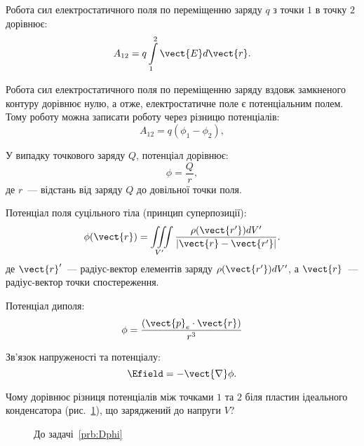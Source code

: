  \begin{Theory}\small
	Робота сил електростатичного поля по переміщенню заряду $q$ з точки $1$ в точку $2$ дорівнює:
	\begin{equation}\label{work}
		A_{12} = q\int\limits_1^2 \vect{E}d\vect{r}.
	\end{equation}

	Робота сил електростатичного поля по переміщенню заряду вздовж замкненого контуру дорівнює нулю, а отже, електростатичне поле є потенціальним полем. Тому роботу можна записати роботу через різницю потенціалів:
	\begin{equation}\label{work_potential}
		A_{12} = q(\phi_1 - \phi_2),
	\end{equation}

	У випадку точкового заряду $Q$, потенціал дорівнює:
	\begin{equation}\label{pot_point}
	\phi = \frac{Q}{r},
	\end{equation}
	де $r$~--- відстань від заряду $Q$ до довільної точки поля.

  Потенціал поля суцільного тіла (принцип суперпозиції):
  \begin{equation}\label{Supperposition_principle}
	  \phi(\vect{r}) = \iiint\limits_{V'} \frac{\rho(\vect{r'}) dV'}{\left| \vect{r} - \vect{r'} \right|}.
  \end{equation}
  де $\vect{r}'$~--- радіус-вектор елементів заряду $\rho(\vect{r'}) dV'$, а $\vect{r}$~--- радіус-вектор точки спостереження.

Потенціал диполя:
	\begin{equation}\label{electric_dipole_potential}
		\phi = \frac{\left( \vect{p}_e\cdot \vect{r}\right) }{r^3}
	\end{equation}

  Зв'язок напруженості та потенціалу:
  \begin{equation}\label{E-phi}
	  \Efield = - \vect{\nabla}\phi.
  \end{equation}
\end{Theory}

\begin{problem}\label{prb:Dphi}
    Чому дорівнює різниця потенціалів між точками $1$ та $2$ біля пластин ідеального конденсатора (рис.~\ref{Dphi}), що заряджений до напруги $V$?

\end{problem}

\begin{figure}[h!]\centering
\caption{До задачі~\ref{prb:Dphi}}
\label{Dphi}
\end{figure}


